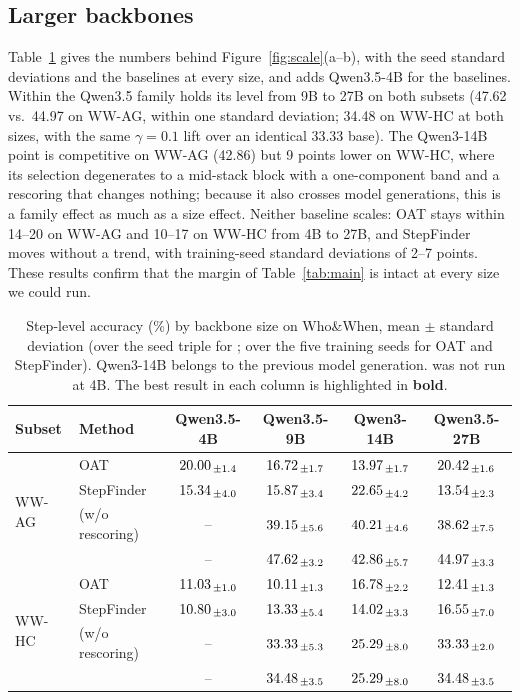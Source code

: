 \subsection{Larger backbones}
\label{app:proxies}

Table~\ref{tab:scale} gives the numbers behind Figure~\ref{fig:scale}(a--b), with the
seed standard deviations and the baselines at every size, and adds Qwen3.5-4B for the
baselines. Within the Qwen3.5 family \soap{} holds its level from 9B to 27B on both
subsets (47.62 vs.\ 44.97 on WW-AG, within one standard deviation; 34.48 on WW-HC at
both sizes, with the same $\gamma=0.1$ lift over an identical 33.33 base). The
Qwen3-14B point is competitive on WW-AG (42.86) but 9 points lower on WW-HC, where
its selection degenerates to a mid-stack block with a one-component band and a
rescoring that changes nothing; because it also crosses model generations, this is
a family effect as much as a size effect. Neither baseline scales: OAT stays within
14--20 on WW-AG and 10--17 on WW-HC from 4B to 27B, and StepFinder moves without a
trend, with training-seed standard deviations of 2--7 points. These results confirm
that the margin of Table~\ref{tab:main} is intact at every size we could run.

\begin{table}[h]
\centering
\small
\setlength{\tabcolsep}{5pt}
\caption{Step-level accuracy (\%) by backbone size on Who\&When, mean $\pm$ standard
deviation (over the seed triple for \soap{}; over the five training seeds for OAT and
StepFinder). Qwen3-14B belongs to the previous model generation. \soap{} was not run
at 4B. The best result in each column is highlighted in \textbf{bold}.}
\label{tab:scale}
\begin{tabular}{l l cccc}
\toprule
Subset & Method & Qwen3.5-4B & Qwen3.5-9B & Qwen3-14B & Qwen3.5-27B \\
\midrule
\multirow{4}{*}{WW-AG}
 & OAT        & $20.00_{\,\pm 1.4}$ & $16.72_{\,\pm 1.7}$ & $13.97_{\,\pm 1.7}$ & $20.42_{\,\pm 1.6}$ \\
 & StepFinder & $15.34_{\,\pm 4.0}$ & $15.87_{\,\pm 3.4}$ & $22.65_{\,\pm 4.2}$ & $13.54_{\,\pm 2.3}$ \\
 & \soap{} (w/o rescoring) & -- & $39.15_{\,\pm 5.6}$ & $40.21_{\,\pm 4.6}$ & $38.62_{\,\pm 7.5}$ \\
 & \soap{}    & -- & $\textbf{\ensuremath{47.62_{\,\pm 3.2}}}$ & $\textbf{\ensuremath{42.86_{\,\pm 5.7}}}$ & $\textbf{\ensuremath{44.97_{\,\pm 3.3}}}$ \\
\midrule
\multirow{4}{*}{WW-HC}
 & OAT        & $11.03_{\,\pm 1.0}$ & $10.11_{\,\pm 1.3}$ & $16.78_{\,\pm 2.2}$ & $12.41_{\,\pm 1.3}$ \\
 & StepFinder & $10.80_{\,\pm 3.0}$ & $13.33_{\,\pm 5.4}$ & $14.02_{\,\pm 3.3}$ & $16.55_{\,\pm 7.0}$ \\
 & \soap{} (w/o rescoring) & -- & $33.33_{\,\pm 5.3}$ & $\textbf{\ensuremath{25.29_{\,\pm 8.0}}}$ & $33.33_{\,\pm 2.0}$ \\
 & \soap{}    & -- & $\textbf{\ensuremath{34.48_{\,\pm 3.5}}}$ & $\textbf{\ensuremath{25.29_{\,\pm 8.0}}}$ & $\textbf{\ensuremath{34.48_{\,\pm 3.5}}}$ \\
\bottomrule
\end{tabular}
\end{table}

